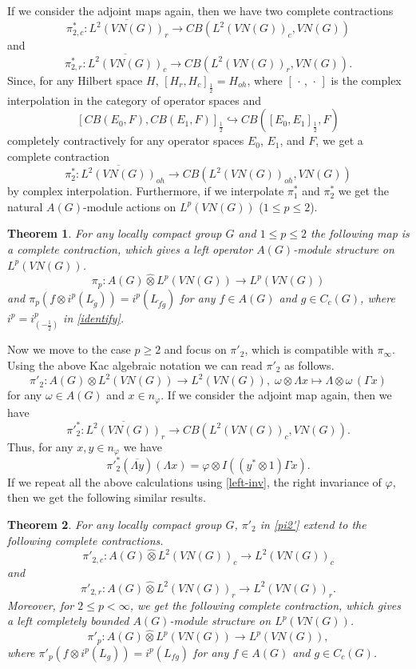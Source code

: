 \documentclass[10pt]{amsart}
\newtheorem{thm}{Theorem}
\numberwithin{thm}{section}
\numberwithin{equation}{section}
\begin{document}
If we consider the adjoint maps again, then we have two complete contractions
	$$\pi^*_{2,c} : \overline{L^2(VN(G))}_r \rightarrow CB(L^2(VN(G))_c, VN(G))$$
and
	$$\pi^*_{2,r} : \overline{L^2(VN(G))}_c \rightarrow CB(L^2(VN(G))_r, VN(G)).$$
Since, for any Hilbert space $H$, $[H_r, H_c]_\frac{1}{2} = H_{oh}$,
where $[\,\cdot\, , \, \cdot\,]$ is the complex interpolation in the category of operator spaces and 
	$$[CB(E_0, F), CB(E_1, F)]_\frac{1}{2} \hookrightarrow CB([E_0, E_1]_\frac{1}{2}, F)$$
completely contractively for any operator spaces $E_0$, $E_1$, and $F$, we get a complete contraction
	$$\pi^*_2 : \overline{L^2(VN(G))}_{oh} \rightarrow CB(L^2(VN(G))_{oh}, VN(G))$$
by complex interpolation.
Furthermore, if we interpolate $\pi^*_1$ and $\pi^*_2$ we get the natural $A(G)$-module actions on $L^p(VN(G))$ ($1\le p\le 2$).

	\begin{thm}\label{thm-Lp-mod1}
	For any locally compact group $G$ and $1\le p\le 2$
 the following map is a complete contraction, which gives a left operator $A(G)$-module structure on $L^p(VN(G))$.
		$$\pi_p : A(G) {\widehat{\otimes}} L^p(VN(G)) \rightarrow L^p(VN(G))$$
	and $\pi_p(f \otimes i^p(L_{\check{g}})) = i^p(L_{\check{f}\check{g}})$ for any $f\in A(G)$ and $g\in C_c(G)$,
	where $i^p = i^p_{(-\frac{1}{2})}$ in \eqref{identify}.	
	\end{thm}

Now we move to the case $p \ge 2$ and focus on $\pi'_2$, which is compatible with $\pi_\infty$.
Using the above Kac algebraic notation we can read $\pi'_2$ as follows.
	\begin{equation}\label{pi2'}
	\pi'_2 : A(G) \otimes L^2(VN(G)) \rightarrow L^2(VN(G)),\; {\omega} \otimes \Lambda x \mapsto \Lambda \otimes {\omega}\, (\Gamma x)
	\end{equation}
for any ${\omega} \in A(G)$ and $x \in n_\varphi$.
If we consider the adjoint map again, then we have
	$$\pi'^*_2 : \overline{L^2(VN(G))}_r \rightarrow CB(L^2(VN(G))_c, VN(G)).$$
Thus, for any $x,y \in n_\varphi$ we have
	$$\pi'^*_2(\overline{\Lambda y})(\Lambda x) = \varphi \otimes I ((y^*\otimes 1)\Gamma x).$$
If we repeat all the above calculations using \eqref{left-inv}, the right invariance of $\varphi$, then we get the following similar results.
	\begin{thm}\label{thm-Lp-mod2}	
	For any locally compact group $G$, $\pi'_2$ in \eqref{pi2'} extend to the following complete contractions.
		$$\pi'_{2,c} : A(G) {\widehat{\otimes}} L^2(VN(G))_c \rightarrow L^2(VN(G))_c$$
	and
		$$\pi'_{2,r} : A(G) {\widehat{\otimes}} L^2(VN(G))_r \rightarrow L^2(VN(G))_r.$$
	Moreover, for $2\le p < \infty$, we get the following complete contraction, which gives a left completely bounded $A(G)$-module structure on $L^p(VN(G))$.
		$$\pi'_p : A(G) {\widehat{\otimes}} L^p(VN(G)) \rightarrow L^p(VN(G)),$$
	where $\pi'_p(f \otimes i^p(L_g)) = i^p(L_{f g})$ for any $f\in A(G)$ and $g\in C_c(G)$.
	\end{thm}
\end{document}
